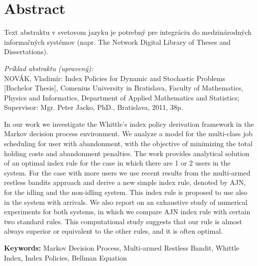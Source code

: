 \thispagestyle{empty}
\section*{Abstract}
Text abstraktu v svetovom jazyku je potrebný pre integráciu do medzinárodných informačných systémov (napr. The Network Digital Library of Theses and Dissertations).

{ \it Príklad  abstraktu (upravený):} \\
NOVÁK, Vladimír: Index Policies for Dynamic and Stochastic Problems [Bachelor
Thesis], Comenius University in Bratislava, Faculty of Mathematics, Physics and Informatics, Department of Applied Mathematics and Statistics; Supervisor: Mgr. Peter Jacko, PhD., Bratislava, 2011, 38p.

In our work we investigate the Whittle's index policy derivation framework in
the Markov decision process environment. We analyze a model for the multi-class job
scheduling for user with abandonment, with the objective of minimizing the total
holding costs and abandonment penalties. The work provides analytical solution of an
optimal index rule for the case in which there are 1 or 2 users in the system. For
the case with more users we use recent results from the multi-armed restless bandits
approach and derive a new simple index rule, denoted by AJN, for the idling and
the non-idling system. This index rule is proposed to use also in the system with
arrivals. We also report on an exhaustive study of numerical experiments for both
systems, in which we compare AJN index rule with  certain two standard  rules. This computational study suggests that our rule is almost always superior or equivalent to the other rules, and it is often optimal.

\begin{flushleft}
  \textbf{Keywords:} Markov Decision Process, Multi-armed Restless Bandit, Whittle Index, Index Policies,  Bellman Equation
\end{flushleft}